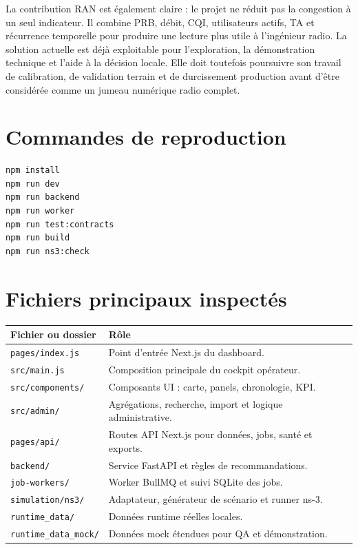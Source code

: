 \documentclass[12pt,a4paper,oneside]{report}
\begin{document}
La contribution RAN est également claire : le projet ne réduit pas la congestion à un seul indicateur. Il combine PRB, débit, CQI, utilisateurs actifs, TA et récurrence temporelle pour produire une lecture plus utile à l'ingénieur radio. La solution actuelle est déjà exploitable pour l'exploration, la démonstration technique et l'aide à la décision locale. Elle doit toutefois poursuivre son travail de calibration, de validation terrain et de durcissement production avant d'être considérée comme un jumeau numérique radio complet.

\appendix
\chapter{Commandes de reproduction}
\begin{lstlisting}
npm install
npm run dev
npm run backend
npm run worker
npm run test:contracts
npm run build
npm run ns3:check
\end{lstlisting}

\chapter{Fichiers principaux inspectés}
\begin{longtable}{p{5cm}p{9cm}}
\toprule
\textbf{Fichier ou dossier} & \textbf{Rôle} \\
\midrule
\texttt{pages/index.js} & Point d'entrée Next.js du dashboard. \\
\texttt{src/main.js} & Composition principale du cockpit opérateur. \\
\texttt{src/components/} & Composants UI : carte, panels, chronologie, KPI. \\
\texttt{src/admin/} & Agrégations, recherche, import et logique administrative. \\
\texttt{pages/api/} & Routes API Next.js pour données, jobs, santé et exports. \\
\texttt{backend/} & Service FastAPI et règles de recommandations. \\
\texttt{job-workers/} & Worker BullMQ et suivi SQLite des jobs. \\
\texttt{simulation/ns3/} & Adaptateur, générateur de scénario et runner ns-3. \\
\texttt{runtime\_data/} & Données runtime réelles locales. \\
\texttt{runtime\_data\_mock/} & Données mock étendues pour QA et démonstration. \\
\bottomrule
\end{longtable}
\end{document}
